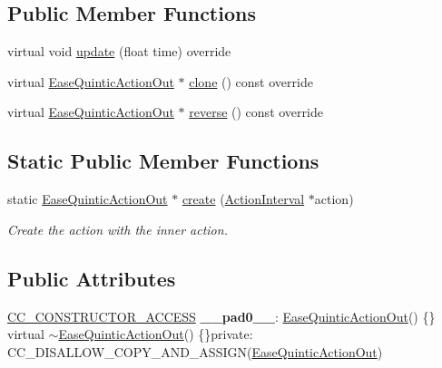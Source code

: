 \subsection*{Public Member Functions}
\begin{DoxyCompactItemize}
\item 
virtual void \hyperlink{classEaseQuinticActionOut_ab78421446d94c0d0ded5329ed9a3716d}{update} (float time) override
\item 
virtual \hyperlink{classEaseQuinticActionOut}{Ease\+Quintic\+Action\+Out} $\ast$ \hyperlink{classEaseQuinticActionOut_aa64dfcfe97d7f5b6684f7fd1ad252492}{clone} () const override
\item 
virtual \hyperlink{classEaseQuinticActionOut}{Ease\+Quintic\+Action\+Out} $\ast$ \hyperlink{classEaseQuinticActionOut_a9a871dbf78c897831b89f17e19e56b12}{reverse} () const override
\end{DoxyCompactItemize}
\subsection*{Static Public Member Functions}
\begin{DoxyCompactItemize}
\item 
static \hyperlink{classEaseQuinticActionOut}{Ease\+Quintic\+Action\+Out} $\ast$ \hyperlink{classEaseQuinticActionOut_a3934ba74423ed596dc34ef8505789174}{create} (\hyperlink{classActionInterval}{Action\+Interval} $\ast$action)
\begin{DoxyCompactList}\small\item\em Create the action with the inner action. \end{DoxyCompactList}\end{DoxyCompactItemize}
\subsection*{Public Attributes}
\begin{DoxyCompactItemize}
\item 
\mbox{\label{classEaseQuinticActionOut_a9432f7bdf31d5c34864f13bf9dce9653}} 
\hyperlink{_2cocos2d_2cocos_2base_2ccConfig_8h_a25ef1314f97c35a2ed3d029b0ead6da0}{C\+C\+\_\+\+C\+O\+N\+S\+T\+R\+U\+C\+T\+O\+R\+\_\+\+A\+C\+C\+E\+SS} {\bfseries \+\_\+\+\_\+pad0\+\_\+\+\_\+}\+: \hyperlink{classEaseQuinticActionOut}{Ease\+Quintic\+Action\+Out}() \{\} virtual $\sim$\hyperlink{classEaseQuinticActionOut}{Ease\+Quintic\+Action\+Out}() \{\}private\+: C\+C\+\_\+\+D\+I\+S\+A\+L\+L\+O\+W\+\_\+\+C\+O\+P\+Y\+\_\+\+A\+N\+D\+\_\+\+A\+S\+S\+I\+GN(\hyperlink{classEaseQuinticActionOut}{Ease\+Quintic\+Action\+Out})
\end{DoxyCompactItemize}

